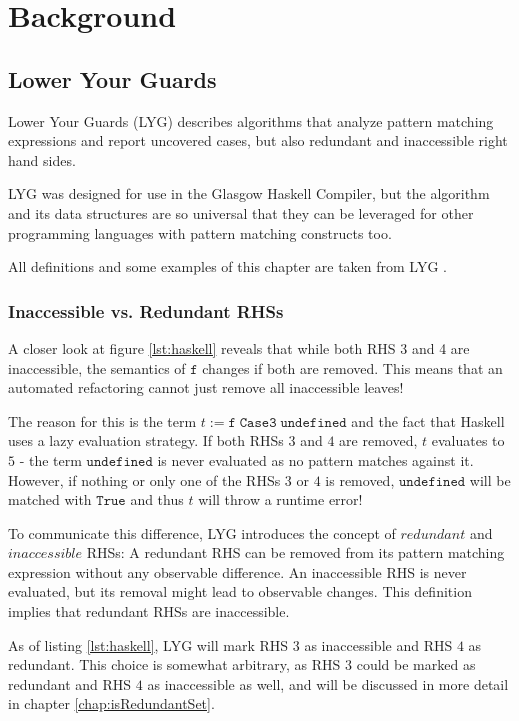 \chapter{Background}\label{sec:background}

\section{Lower Your Guards}

Lower Your Guards (LYG) \cite{10.1145/3408989} describes algorithms that analyze pattern matching expressions and report uncovered cases, but also redundant and inaccessible right hand sides.

LYG was designed for use in the Glasgow Haskell Compiler,
but the algorithm and its data structures are so universal
that they can be leveraged for other programming languages with pattern matching constructs too.

All definitions and some examples of this chapter are taken from LYG \cite{10.1145/3408989}.

\subsection{Inaccessible vs. Redundant RHSs}

A closer look at figure \ref{lst:haskell} reveals that while both RHS 3 and 4 are inaccessible,
the semantics of $\mathtt{f}$ changes if both are removed.
This means that an automated refactoring cannot just remove all inaccessible leaves!

The reason for this is the term $t := \mathtt{f}\;\mathtt{Case3}\;\mathtt{undefined}$ and the fact that Haskell uses a lazy evaluation strategy.
If both RHSs $3$ and $4$ are removed, $t$ evaluates to $5$ - the term $\mathtt{undefined}$ is never evaluated as no pattern matches against it.
However, if nothing or only one of the RHSs $3$ or $4$ is removed, $\mathtt{undefined}$ will be matched with $\mathtt{True}$ and thus $t$ will throw a runtime error!

To communicate this difference, LYG introduces the concept of $\mathit{redundant}$ and $\mathit{inaccessible}$ RHSs:
A redundant RHS can be removed from its pattern matching expression without any observable difference.
An inaccessible RHS is never evaluated, but its removal might lead to observable changes.
This definition implies that redundant RHSs are inaccessible.

As of listing \ref{lst:haskell}, LYG will mark RHS $3$ as inaccessible and RHS $4$ as redundant.
This choice is somewhat arbitrary, as RHS $3$ could be marked as redundant and RHS $4$ as inaccessible as well, and will be discussed in more detail in chapter \ref{chap:isRedundantSet}.


